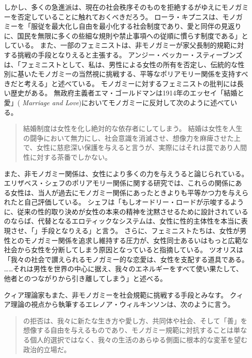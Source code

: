 \documentclass[paper=a4,book,openany]{jlreq} \usepackage{mystyle}
\begin{document}
しかし、多くの急進派は、現在の社会秩序そのものを拒絶するがゆえにモノガミーを否定していることに触れておくべきだろう。
ローラ・キプニスは、モノガミーを「服従を最大化し自由を最小化する社会制度であり、愛と同伴の見返りに、国民を無限に多くの些細な規則や禁止事項への従順に慣らす制度である」としている\citep{kipnis03:_troub_marriag}。
また、一部のフェミニストは、非モノガミーが家父長制的規範に対する挑戦の手段となりえると主張する。
アンジー・ベッカー・スティーブンズは、「フェミニストとして、私は、男性による女性の所有を否定し、伝統的な性別に基いたモノガミーの当然視に挑戦する、平等なポリアモリー関係を支持すべきだと考える」と述べている\citep{stevens13:_shoul_femin_be_critic_compul_monog}。
モノガミーに対するフェミニストの批判には長い歴史がある。
無政府主義者エマ・ゴールドマンは1914年のエッセイ「結婚と愛」( \emph{Marriage and Love})においてモノガミーに反対して次のように述べている。

\begin{quote}
結婚制度は女性を化し絶対的な依存者にしてしまう。
結婚は女性を人生の闘争において無力にし、社会意識を消滅させ、想像力を麻痺させた上で、女性に慈悲深い保護を与えると言うが、実際にはそれは罠であり人間性に対する茶番でしかない。
\citep{goldman14:_marriag_love}
\end{quote}

また、非モノガミー関係は、女性により多くの力を与えうると論じられている。
エリザベス・シェフのポリアモリー関係に関する研究では、これらの関係にある女性は、当人が過去にモノガミー関係にあったときよりも平等かつ力を与えられたと自己評価している。
シェフは「もしオードリー・ロードが示唆するように、従来の性的取り決めが女性の本来の精神を沈黙させるために設計されているのならば、代替となるエロティックなシステムは、女性に性的主体性を本当に表現させ、「」手段となりえる」と言う\citep[p.6]{sheff05:_polyam_women_sexual_subjec_power}。
さらに、フェミニストたちは、女性が男性とのモノガミー関係を追求し維持する圧力が、女性同士あるいはもっと広範な社会から女性を分断してしまう原因となっていると指摘している\citep{rosa94:_anti}。
ツオリスは「我々の社会で讃えられるモノガミー的な恋愛は、女性を支配する道具である。
……それは男性を世界の中心に据え、我々のエネルギーをすべて使い果たして、他者とのつながりから引き離してしまう」と述べる\citep[p.25]{tsoulis87:_heter}。

クィア理論家もまた、非モノガミーを社会規範に挑戦する手段とみなす。
クィア理論の視点から執筆するエレノア・ウィルキンソンは、次のように言う。

\begin{quote}

  の拒否は、我々に新たな生き方や愛し方、共同体や社会、そして「善」を想像する自由を与えるものであり、モノガミー規範に対抗することは単なる個人的選択ではなく、我々の生活のあらゆる側面に根本的な変革を望む政治的立場だ。
\citep[p.344]{wilkinson10:_whats_queer_non_monog_now}

\end{quote}
\end{document}
